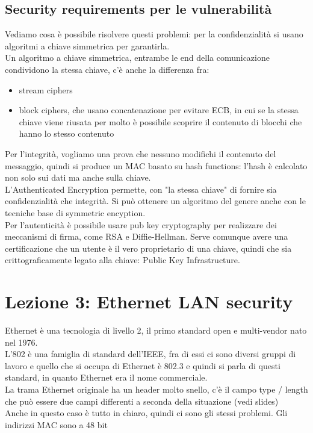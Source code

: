 \documentclass[12pt, oneside]{extbook} %
\begin{document}
\subsection{Security requirements per le vulnerabilità}
Vediamo cosa è possibile risolvere questi problemi: per la confidenzialità si usano algoritmi a chiave simmetrica per garantirla.\\ Un algoritmo a chiave simmetrica, entrambe le end della comunicazione condividono la stessa chiave, c'è anche la differenza fra:
\begin{itemize}
\item stream ciphers 
\item block ciphers, che usano concatenazione per evitare ECB, in cui se la stessa chiave viene riusata per molto è possibile scoprire il contenuto di blocchi che hanno lo stesso contenuto
\end{itemize}
Per l'integrità, vogliamo una prova che nessuno modifichi il contenuto del messaggio, quindi si produce un MAC basato su hash functions: l'hash è calcolato non solo sui dati ma anche sulla chiave.\\ L'Authenticated Encryption permette, con "la stessa chiave" di fornire sia confidenzialità che integrità. Si può ottenere un algoritmo del genere anche con le tecniche base di symmetric encyption.\\ Per l'autenticità è possibile usare pub key cryptography per realizzare dei meccanismi di firma, come RSA e Diffie-Hellman. Serve comunque avere una certificazione che un utente è il vero proprietario di una chiave, quindi che sia crittograficamente legato alla chiave: Public Key Infrastructure.

\section{Lezione 3: Ethernet LAN security}
Ethernet è una tecnologia di livello 2, il primo standard open e multi-vendor nato nel 1976.\\ L'802 è una famiglia di standard dell'IEEE, fra di essi ci sono diversi gruppi di lavoro e quello che si occupa di Ethernet è 802.3 e quindi si parla di questi standard, in quanto Ethernet era il nome commerciale.\\ La trama Ethernet originale ha un header molto snello, c'è il campo type / length che può essere due campi differenti a seconda della situazione (vedi slides)\\ Anche in questo caso è tutto in chiaro, quindi ci sono gli stessi problemi. Gli indirizzi MAC sono a 48 bit
\end{document}

